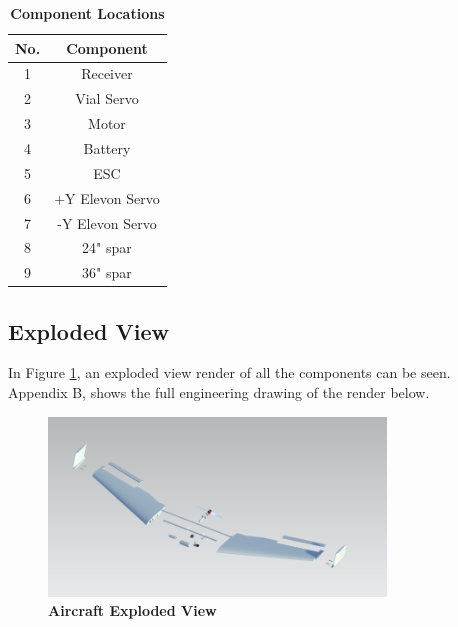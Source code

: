         \begin{table}[H]
        \begin{center}
        \caption{\textbf{Component Locations}} \label{tab:component_locations}
        \begin{tabular}{|c|c|} 
            \hline
            \textbf{No.} & \textbf{Component} \\ \hline
            1 & Receiver \\ \hline
            2 & Vial Servo \\ \hline
            3 & Motor \\ \hline
            4 & Battery \\ \hline
            5 & ESC \\ \hline
            6 & +Y Elevon Servo \\ \hline
            7 & -Y Elevon Servo \\ \hline
            8 & 24" spar \\ \hline
            9 & 36" spar \\ \hline
        \end{tabular}
        \end{center}
        \end{table}
        
    \subsection{Exploded View}
    
        In Figure \ref{fig:exploded}, an exploded view render of all the components can be seen. Appendix B, shows the full engineering drawing of the render below.
        
        \begin{figure}[H]
            \centering
            \includegraphics[width=0.8\textwidth]{homeworks/homework4/report/Figure/aircraft_assembly_exploded.png}
            \caption{\textbf{Aircraft Exploded View}}
            \label{fig:exploded}
        \end{figure}
    
